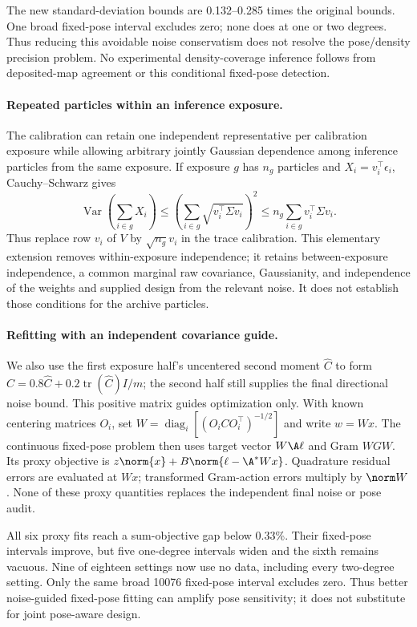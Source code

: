 The new standard-deviation bounds are 0.132--0.285 times the original bounds.
One broad fixed-pose interval excludes zero; none does at one or two degrees.
Thus reducing this avoidable noise conservatism does not resolve the
pose/density precision problem. No experimental density-coverage inference
follows from deposited-map agreement or this conditional fixed-pose detection.

\paragraph{Repeated particles within an inference exposure.}
The calibration can retain one independent representative per calibration
exposure while allowing arbitrary jointly Gaussian dependence among inference
particles from the same exposure. If exposure $g$ has $n_g$ particles and
$X_i=v_i^\top\epsilon_i$, Cauchy--Schwarz gives
\[
 \operatorname{Var}\!\left(\sum_{i\in g}X_i\right)
 \le\left(\sum_{i\in g}\sqrt{v_i^\top\Sigma v_i}\right)^2
 \le n_g\sum_{i\in g}v_i^\top\Sigma v_i.
\]
Thus replace row $v_i$ of $V$ by $\sqrt{n_g}v_i$ in the trace calibration.
This elementary extension removes within-exposure independence; it retains
between-exposure independence, a common marginal raw covariance, Gaussianity,
and independence of the weights and supplied design from the relevant noise.
It does not establish those conditions for the archive particles.

\paragraph{Refitting with an independent covariance guide.}
We also use the first exposure half's uncentered second moment $\widehat C$
to form $C=0.8\widehat C+0.2\operatorname{tr}(\widehat C)I/m$; the second half
still supplies the final directional noise bound. This positive matrix guides
optimization only. With known centering matrices $O_i$, set
$W=\operatorname{diag}_i[(O_iCO_i^\top)^{-1/2}]$ and write $w=Wx$.
The continuous fixed-pose problem then uses target vector $W\A\ell$ and Gram
$WGW$. Its proxy objective is $z\norm{x}+B\norm{\ell-\A^*Wx}$.
Quadrature residual errors are evaluated at $Wx$; transformed Gram-action
errors multiply by $\norm W$. None of these proxy quantities replaces the
independent final noise or pose audit.


All six proxy fits reach a sum-objective gap below 0.33\%. Their fixed-pose
intervals improve, but five one-degree intervals widen and the sixth remains
vacuous. Nine of eighteen settings now use no data, including every two-degree
setting. Only the same broad 10076 fixed-pose interval excludes zero. Thus
better noise-guided fixed-pose fitting can amplify pose sensitivity; it does
not substitute for joint pose-aware design.

